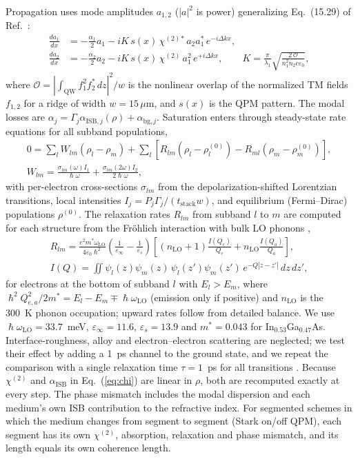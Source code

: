 \documentclass[11pt]{article}
\newcommand{\chitwo}{\chi^{(2)}}
\newcommand{\um}{\,\mu\mathrm{m}}
\begin{document}
Propagation uses mode amplitudes $a_{1,2}$ ($|a|^2$ is power) generalizing Eq.~(15.29) of Ref.~\cite{Vurgaftman2021}:
\begin{align}
\frac{da_1}{dx}&=-\frac{\alpha_1}{2}a_1-iK\,s(x)\,\chitwo{}^*\,a_2a_1^*\,e^{-i\Delta k x},\\
\frac{da_2}{dx}&=-\frac{\alpha_2}{2}a_2-iK\,s(x)\,\chitwo\,a_1^2\,e^{+i\Delta k x},\qquad K=\frac{\pi}{\lambda_1}\sqrt{\frac{2\,\mathcal{O}}{n_1^2n_2c\varepsilon_0}},
\end{align}
where $\mathcal{O}=|\int_\mathrm{QW}f_1^2f_2^*\,dz|^2/w$ is the nonlinear overlap of the normalized TM fields $f_{1,2}$ for a ridge of width $w=15\um$, and $s(x)$ is the QPM pattern. The modal losses are $\alpha_j=\Gamma_j\alpha_{\mathrm{ISB},j}(\rho)+\alpha_{\mathrm{bg},j}$. Saturation enters through steady-state rate equations for all subband populations,
\begin{gather}
0=\sum_l W_{lm}(\rho_l-\rho_m)+\sum_l\left[R_{lm}(\rho_l-\rho_l^{(0)})-R_{ml}(\rho_m-\rho_m^{(0)})\right],\label{eq:rate}\\
W_{lm}=\frac{\sigma_{lm}(\omega)I_1}{\hslash\omega}+\frac{\sigma_{lm}(2\omega)I_2}{2\hslash\omega},\nonumber
\end{gather}
with per-electron cross-sections $\sigma_{lm}$ from the depolarization-shifted Lorentzian transitions, local intensities $I_j=P_j\Gamma_j/(t_\mathrm{stack}w)$, and equilibrium (Fermi--Dirac) populations $\rho^{(0)}$. The relaxation rates $R_{lm}$ from subband $l$ to $m$ are computed for each structure from the Fr\"ohlich interaction with bulk LO phonons \cite{Ferreira1989},
\begin{gather}
R_{lm}=\frac{e^2m^*\omega_\mathrm{LO}}{4\varepsilon_0\hslash^2}\left(\frac{1}{\varepsilon_\infty}-\frac{1}{\varepsilon_s}\right)\left[(n_\mathrm{LO}+1)\frac{I(Q_e)}{Q_e}+n_\mathrm{LO}\frac{I(Q_a)}{Q_a}\right],\label{eq:lo}\\
I(Q)=\iint\psi_l(z)\psi_m(z)\,\psi_l(z')\psi_m(z')\,e^{-Q|z-z'|}\,dz\,dz',\nonumber
\end{gather}
for electrons at the bottom of subband $l$ with $E_l>E_m$, where $\hslash^2Q_{e,a}^2/2m^*=E_l-E_m\mp\hslash\omega_\mathrm{LO}$ (emission only if positive) and $n_\mathrm{LO}$ is the 300~K phonon occupation; upward rates follow from detailed balance. We use $\hslash\omega_\mathrm{LO}=33.7$~meV, $\varepsilon_\infty=11.6$, $\varepsilon_s=13.9$ and $m^*=0.043$ for In$_{0.53}$Ga$_{0.47}$As. Interface-roughness, alloy and electron--electron scattering are neglected; we test their effect by adding a 1~ps channel to the ground state, and we repeat the comparison with a single relaxation time $\tau=1$~ps for all transitions \cite{Vurgaftman2021}. Because $\chitwo$ and $\alpha_\mathrm{ISB}$ in Eq.~(\ref{eq:chi}) are linear in $\rho$, both are recomputed exactly at every step. The phase mismatch includes the modal dispersion and each medium's own ISB contribution to the refractive index. For segmented schemes in which the medium changes from segment to segment (Stark on/off QPM), each segment has its own $\chitwo$, absorption, relaxation and phase mismatch, and its length equals its own coherence length.
\end{document}
